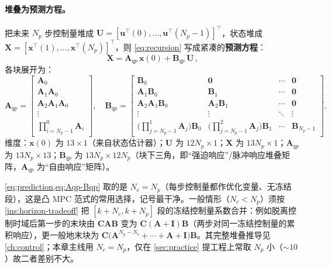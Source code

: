 \paragraph{堆叠为预测方程。}
把未来 $N_p$ 步控制量堆成 $\mathbf{U}=[\boldsymbol{u}^\top(0),\dots,\boldsymbol{u}^\top(N_p-1)]^\top$，状态堆成 $\mathbf{X}=[\boldsymbol{x}^\top(1),\dots,\boldsymbol{x}^\top(N_p)]^\top$，则 \cref{eq:recursion} 写成紧凑的\textbf{预测方程}\cite{yu2021quadruped}：
\begin{equation}
  \boxed{\,\mathbf{X}=\mathbf{A}_{qp}\,\boldsymbol{x}(0)+\mathbf{B}_{qp}\,\mathbf{U}\,},
  \label{eq:prediction}
\end{equation}
各块展开为\cite{yu2021quadruped}：
\begin{equation}
\mathbf{A}_{qp}=\begin{bmatrix} \mathbf{A}_0 \\ \mathbf{A}_1\mathbf{A}_0 \\ \mathbf{A}_2\mathbf{A}_1\mathbf{A}_0 \\ \vdots \\ \prod_{i=N_p-1}^{0}\mathbf{A}_i \end{bmatrix},
\quad
\mathbf{B}_{qp}=\begin{bmatrix}
\mathbf{B}_0 & \mathbf{0} & \cdots & \mathbf{0} \\
\mathbf{A}_1\mathbf{B}_0 & \mathbf{B}_1 & \cdots & \mathbf{0} \\
\mathbf{A}_2\mathbf{A}_1\mathbf{B}_0 & \mathbf{A}_2\mathbf{B}_1 & \cdots & \mathbf{0} \\
\vdots & \vdots & \ddots & \vdots \\
\big(\prod_{j=N_p-1}^{1}\mathbf{A}_j\big)\mathbf{B}_0 & \big(\prod_{j=N_p-1}^{2}\mathbf{A}_j\big)\mathbf{B}_1 & \cdots & \mathbf{B}_{N_p-1}
\end{bmatrix}.
\label{eq:Aqp-Bqp}
\end{equation}
维度：$\boldsymbol{x}(0)$ 为 $13\times1$（来自状态估计器）；$\mathbf{U}$ 为 $12N_p\times1$；$\mathbf{X}$ 为 $13N_p\times1$；$\mathbf{A}_{qp}$ 为 $13N_p\times13$；$\mathbf{B}_{qp}$ 为 $13N_p\times12N_p$（块下三角，即“强迫响应”/脉冲响应堆叠矩阵，$\mathbf{A}_{qp}$ 为“自由响应”矩阵）。

\begin{note}[本书取 $N_c=N_p$ 的简化与一般情形]\label{note:Nc-eq-Np}
\cref{eq:prediction,eq:Aqp-Bqp} 取的是 $N_c=N_p$（每步控制量都作优化变量、无冻结段），这是凸 MPC 范式的常用选择，记号最干净。一般情形（$N_c<N_p$）须按 \cref{ins:horizon-tradeoff} 把 $[k{+}N_c,k{+}N_p]$ 段的冻结控制量系数合并：例如脱离控制时域后第一步的末块由 $\mathbf{C}\mathbf{A}\mathbf{B}$ 变为 $\mathbf{C}(\mathbf{A}+\mathbf{I})\mathbf{B}$（两步对同一冻结控制量的累积响应），更一般地末块为 $\mathbf{C}\big(\mathbf{A}^{N_p-N_c}+\cdots+\mathbf{A}+\mathbf{I}\big)\mathbf{B}$。其完整堆叠推导见 \cref{ch:control}；本章主线用 $N_c=N_p$，仅在 \cref{sec:practice} 提工程上常取 $N_p$ 小（$\sim10$）故二者差别不大。
\end{note}

